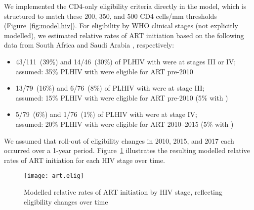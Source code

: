 \par
We implemented the CD4-only eligibility criteria directly in the model,
which is structured to match these 200, 350, and 500 CD4 cells/mm thresholds
(Figure~\ref{fig:model.hiv}).
For eligibility by WHO clinical stages (not explicitly modelled),
we estimated relative rates of ART initiation based on the following data from
South Africa \cite[Table~4]{Badri2004} and Saudi Arabia \cite[Table~2]{Edathodu2009}, respectively:
\begin{itemize}
  \item 43/111~(39\%) and 14/46~(30\%) of PLHIV with  were at stages III or IV;\\
        assumed: 35\% PLHIV with  were eligible for ART pre-2010
  \item 13/79~(16\%) and 6/76~(8\%) of PLHIV with  were at stage III;\\
        assumed: 15\% PLHIV with  were eligible for ART pre-2010
        (5\% with )
  \item 5/79~(6\%) and 1/76~(1\%) of PLHIV with  were at stage IV;\\
        assumed: 20\% PLHIV with  were eligible for ART 2010--2015
        (5\% with )
\end{itemize}
We assumed that roll-out of eligibility changes in 2010, 2015, and 2017
each occurred over a 1-year period.
Figure~\ref{fig:art.elig} illustrates
the resulting modelled relative rates of ART initiation for each HIV stage over time.
\begin{figure}
  \centering
  \texttt{[image: art.elig]}
  \caption{Modelled relative rates of ART initiation by HIV stage,
    reflecting eligibility changes over time}
  \label{fig:art.elig}
\end{figure}
